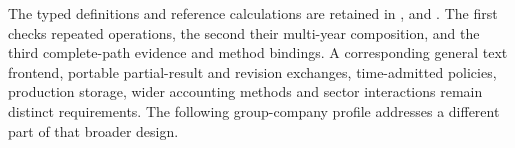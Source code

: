 The typed definitions and reference calculations are retained in
,
 and
.
The first checks repeated operations, the second their multi-year composition,
and the third complete-path evidence and method bindings. A corresponding
general text frontend, portable partial-result and revision exchanges,
time-admitted policies, production storage, wider accounting methods and sector
interactions remain distinct requirements. The following group-company profile
addresses a different part of that broader design.
